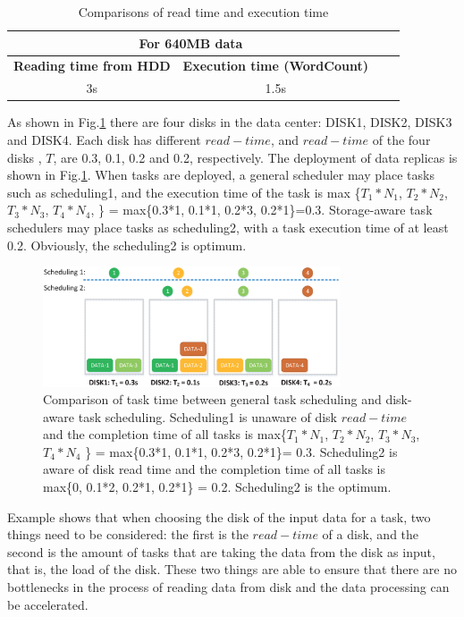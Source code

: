 \documentclass[conference]{IEEEtran}
\begin{document}
\begin{table}[htbp]
	\caption{Comparisons of read time and execution time}
	\begin{center}
		\begin{tabular}{|c|c|c|c|}
			\hline
			\multicolumn{2}{|c|}{\textbf{For 640MB data}} \\
			\hline
			\textbf{Reading time from HDD}& \textbf{Execution time (WordCount)}\\
			\hline
			3s & 1.5s  \\
			\hline
		\end{tabular}
		\label{tab1}
	\end{center}
\end{table}

As shown in Fig.\ref{fig1} there are four disks in the data center: DISK1, DISK2, DISK3 and DISK4. Each disk has different $read-time$, and $read-time$ of the four disks , $T$, are 0.3, 0.1, 0.2 and 0.2, respectively. The deployment of data replicas is shown in Fig.\ref{fig1}. When tasks are deployed, a general scheduler may place tasks such as scheduling1, and the execution time of the task is max \{$T_1 * N_1$, $T_2 * N_2$, $T_3 * N_3$,  $T_4 * N_4$, \} = max\{0.3*1, 0.1*1, 0.2*3, 0.2*1\}=0.3. Storage-aware task schedulers may place tasks as scheduling2, with a task execution time of at least 0.2. Obviously, the scheduling2 is optimum.

\begin{figure}[!t]
	\centering
	\includegraphics[height=1.4in]{fig1.eps}
	\caption{Comparison of task time between general task scheduling and disk-aware task scheduling. Scheduling1 is unaware of disk $read-time$ and the completion time of all tasks is max\{$T_1 * N_1$, $T_2 * N_2$, $T_3 * N_3$,  $T_4 * N_4$ \} = max\{0.3*1, 0.1*1, 0.2*3, 0.2*1\}= 0.3. Scheduling2 is aware of disk read time and the completion time of all tasks is max\{0, 0.1*2, 0.2*1, 0.2*1\} = 0.2. Scheduling2 is the optimum. }
	\label{fig1}
\end{figure}

Example shows that when choosing the disk of the input data for a task, two things need to be considered: the first is the $read-time$ of a disk, and the second is the amount of tasks that are taking the data from the disk as input, that is, the load of the disk. These two things are able to ensure that there are no bottlenecks in the process of reading data from disk and the data processing can be accelerated.
\end{document}
